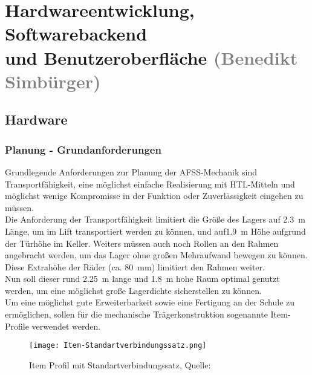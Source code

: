 \section{Hardwareentwicklung, Softwarebackend \\ und Benutzeroberfläche \textcolor{gray}{(Benedikt Simbürger)}}

\subsection{Hardware}

\subsubsection{Planung - Grundanforderungen} 
Grundlegende Anforderungen zur Planung der AFSS-Mechanik sind Transportfähigkeit, eine möglichst einfache Realisierung mit HTL-Mitteln und möglichst wenige Kompromisse in der Funktion oder Zuverlässigkeit eingehen zu müssen.\\
Die Anforderung der Transportfähigkeit limitiert die Größe des Lagers auf \SI{2.3}{\meter} Länge, um im Lift transportiert werden zu können, und auf\SI{1.9}{\meter} Höhe aufgrund der Türhöhe im Keller. Weiters müssen auch noch Rollen an den Rahmen angebracht werden, um das Lager ohne großen Mehraufwand bewegen zu können. Diese Extrahöhe der Räder (ca. \SI{80}{\mm}) limitiert den Rahmen weiter.\\
Nun soll dieser rund \SI{2.25}{\meter} lange und \SI{1.8}{\meter} hohe Raum optimal genutzt werden, um eine möglichst große Lagerdichte sicherstellen zu können.\\
Um eine möglichst gute Erweiterbarkeit sowie eine Fertigung an der Schule zu ermöglichen, sollen für die mechanische Trägerkonstruktion sogenannte Item-Profile verwendet werden.


\begin{wrapfigure}{r}{0.3\textwidth}
    \vspace{0mm}
    \texttt{[image: Item-Standartverbindungssatz.png]}
    \centering
    \caption{Item Profil mit Standartverbindungssatz, Quelle: \cite{Item_svs}}
    \label{sfs_item}
\end{wrapfigure}

